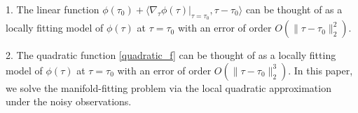 \documentclass{article}
\newtheorem{assumption}[theorem]{Assumption}
\theoremstyle{remark}
\begin{document}
1. The linear function
$
\phi(\tau_0) + \langle \nabla_\tau \phi(\tau)|_{\tau=\tau_0}, \tau-\tau_0 \rangle
$ 
can be thought of as a locally fitting model of $\phi(\tau)$ at $\tau=\tau_0$ with an error of order $O(\|\tau-\tau_0 \|_2^2)$.

2. The quadratic function \eqref{quadratic_f} can be thought of as a locally fitting model of $\phi(\tau)$ at $\tau=\tau_0$ with an error of order $O(\|\tau-\tau_0 \|_2^3)$.
In this paper, we solve the manifold-fitting problem via the local quadratic approximation under the noisy observations. %
\end{document}
